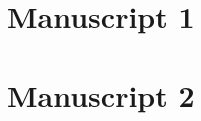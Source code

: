 \documentclass[a4paper,10pt]{book}
\begin{document}
\chapter{Manuscript 1}

\chapter{Manuscript 2}




% 
% 
% 
\end{document}
